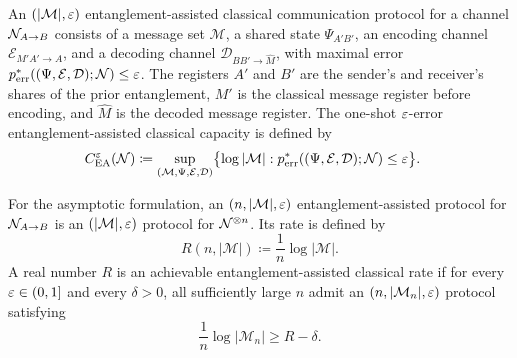 \documentclass[10pt,a4paper]{article}
\begin{document}
\begin{definition}
    \label{def:ea-one-shot-capacity}
    An $(|\mathcal M|,\varepsilon)$ entanglement-assisted classical communication
    protocol for a channel ${\cal N}_{A\to B}$ consists of a message set
    $\mathcal M$, a shared state $\Psi_{A'B'}$, an encoding channel
    $\mathcal E_{M'A'\to A}$, and a decoding channel
    $\mathcal D_{BB'\to \widehat M}$, with maximal error
    $p_{\mathrm{err}}^*((\Psi,\mathcal E,\mathcal D);{\cal N})\le \varepsilon$.  The
    registers $A'$ and $B'$ are the sender's and receiver's shares of the
    prior entanglement, $M'$ is the classical message register before
    encoding, and $\widehat M$ is the decoded message register.  The
    one-shot $\varepsilon$-error entanglement-assisted classical capacity is defined by
    \begin{equation}
        \begin{aligned}
            C_{\operatorname{EA}}^{\varepsilon}({\cal N})
            &\coloneqq
            \sup_{(\mathcal M,\Psi,\mathcal E,\mathcal D)}
            \bigl\{\log|\mathcal M|:
            p_{\mathrm{err}}^*((\Psi,\mathcal E,\mathcal D);{\cal N})\le \varepsilon\bigr\}.
        \end{aligned}
    \end{equation}
\end{definition}

For the asymptotic formulation, an $(n,|\mathcal M|,\varepsilon)$
entanglement-assisted protocol for ${\cal N}_{A\to B}$ is an
$(|\mathcal M|,\varepsilon)$ protocol for ${\cal N}^{\otimes n}$.  Its rate is defined by
\begin{equation}
    R(n,|\mathcal M|)
    \coloneqq
    \frac{1}{n}\log|\mathcal M|.
\end{equation}
A real number $R$ is an achievable entanglement-assisted classical rate if
for every $\varepsilon\in(0,1]$ and every $\delta>0$, all sufficiently large
$n$ admit an $(n,|\mathcal M_n|,\varepsilon)$ protocol satisfying
\begin{equation}
    \frac{1}{n}\log|\mathcal M_n|\ge R-\delta .
\end{equation}
\end{document}
